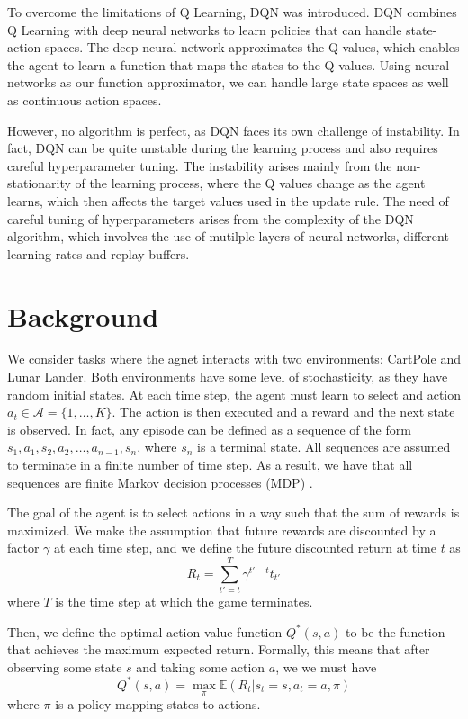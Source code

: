 \documentclass{article}
\newcommand{\e}[1]{\mathbb{E}(#1)}
\begin{document}
To overcome the limitations of Q Learning, DQN was introduced. DQN combines Q
Learning with deep neural networks to learn policies that can handle
state-action spaces. The deep neural network approximates the Q values, which
enables the agent to learn a function that maps the states to the Q values.
Using neural networks as our function approximator, we can handle large state
spaces as well as continuous action spaces.

However, no algorithm is perfect, as DQN faces its own challenge of
instability. In fact, DQN can be quite unstable during the learning process and
also requires careful hyperparameter tuning. The instability arises mainly from
the non-stationarity of the learning process, where the Q values change as the
agent learns, which then affects the target values used in the update rule. The
need of careful tuning of hyperparameters arises from the complexity of the DQN
algorithm, which involves the use of mutilple layers of neural networks,
different learning rates and replay buffers.

\section{Background}

We consider tasks where the agnet interacts with two environments: CartPole and
Lunar Lander. Both environments have some level of stochasticity, as they have
random initial states. At each time step, the agent must learn to select and
action \(a_t \in \mathcal{A} = \{1, \hdots, K\}\). The action is then executed
and a reward and the next state is observed. In fact, any episode can be
defined as a sequence of the form \(s_1, a_1, s_2, a_2, \hdots, a_{n-1}, s_n\),
where \(s_n\) is a terminal state. All sequences are assumed to terminate in a
finite number of time step. As a result, we have that all sequences are finite
Markov decision processes (MDP) \cite{DBLP:journals/corr/MnihKSGAWR13}.

The goal of the agent is to select actions in a way such that the sum of
rewards is maximized. We make the assumption that future rewards are discounted
by a factor \(\gamma\) at each time step, and we define the future discounted
return at time \(t\) as
\begin{equation}
      R_t = \sum_{t' = t}^{T} \gamma^{t' - t}t_{t'}
\end{equation}
where \(T\) is the time step at which the game terminates.

Then, we define the optimal action-value function \(Q^*(s,a)\) to be the
function that achieves the maximum expected return. Formally, this means that
after observing some state \(s\) and taking some action \(a\), we we must have
\begin{equation}
      Q^*(s,a) = \max_\pi \e{R_t | s_t = s, a_t = a, \pi}
\end{equation}
where \(\pi\) is a policy mapping states to actions.
\end{document}
